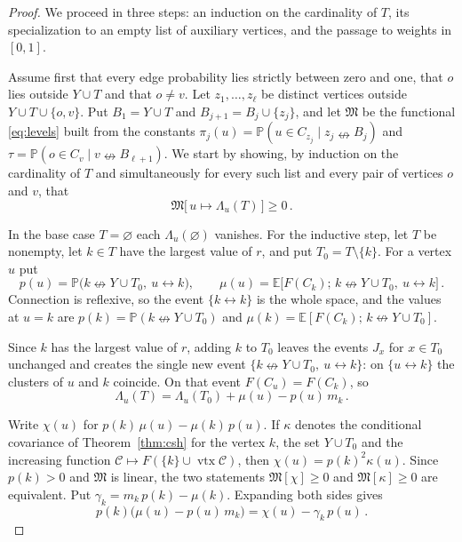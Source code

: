 \documentclass[11pt]{article}
\theoremstyle{definition}
\theoremstyle{remark}
\newcommand{\PP}{\mathbb P}
\newcommand{\EE}{\mathbb E}
\newcommand{\con}{\leftrightarrow}
\newcommand{\ncon}{\nleftrightarrow}
\newcommand{\eC}{\mathcal C}
\DeclareMathOperator{\vtx}{vtx}
\newcommand{\Marg}{\mathfrak M}
\begin{document}
\begin{proof}
We proceed in three steps: an induction on the cardinality of $T$, its specialization to an
empty list of auxiliary vertices, and the passage to weights in $[0,1]$.

Assume first that every edge probability lies strictly between zero and one, that $o$ lies
outside $Y\cup T$ and that $o\neq v$. Let $z_1,\dots,z_\ell$ be distinct vertices outside
$Y\cup T\cup\{o,v\}$. Put $B_1=Y\cup T$ and $B_{j+1}=B_j\cup\{z_j\}$, and let $\Marg$ be the functional
\eqref{eq:levels} built from the constants
$\pi_j(u)=\PP(u\in C_{z_j}\mid z_j\ncon B_j)$ and
$\tau=\PP(o\in C_v\mid v\ncon B_{\ell+1})$. We start by
showing, by induction on the cardinality of $T$ and simultaneously for every such list and
every pair of vertices $o$ and $v$, that
\begin{equation}\label{eq:s5d}
 \Marg\bigl[\,u\mapsto\Lambda_u(T)\,\bigr]\geq 0\,.
\end{equation}

In the base case $T=\varnothing$ each $\Lambda_u(\varnothing)$ vanishes. For the inductive
step, let $T$ be nonempty, let $k\in T$ have the largest value of $r$, and put
$T_0=T\setminus\{k\}$. For a vertex $u$ put
\[
 p(u)=\PP\bigl(k\ncon Y\cup T_0,\ u\con k\bigr),\qquad
 \mu(u)=\EE\bigl[F(C_k);\,k\ncon Y\cup T_0,\ u\con k\bigr]\,.
\]
Connection is reflexive, so the event $\{k\con k\}$ is the whole space, and the values at
$u=k$ are $p(k)=\PP(k\ncon Y\cup T_0)$ and
$\mu(k)=\EE[F(C_k);\,k\ncon Y\cup T_0]$.

Since $k$ has the largest value of $r$, adding $k$ to $T_0$ leaves the events $J_x$ for
$x\in T_0$ unchanged and creates the single new event $\{k\ncon Y\cup T_0,\ u\con k\}$: on
$\{u\con k\}$ the clusters of $u$ and $k$ coincide. On that event $F(C_u)=F(C_k)$, so
\begin{equation}\label{eq:peel}
 \Lambda_u(T)=\Lambda_u(T_0)+\mu(u)-p(u)\,m_k\,.
\end{equation}

Write $\chi(u)$ for $p(k)\,\mu(u)-\mu(k)\,p(u)$. If $\kappa$ denotes the conditional
covariance of Theorem~\ref{thm:csh} for the vertex $k$, the set $Y\cup T_0$ and the
increasing function $\eC\mapsto F(\{k\}\cup\vtx\eC)$, then $\chi(u)=p(k)^2\kappa(u)$.
Since $p(k)>0$ and $\Marg$ is linear, the two statements $\Marg[\chi]\geq0$ and
$\Marg[\kappa]\geq0$ are equivalent. Put $\gamma_k=m_k\,p(k)-\mu(k)$. Expanding
both sides gives
\begin{equation}\label{eq:covid}
 p(k)\bigl(\mu(u)-p(u)\,m_k\bigr)=\chi(u)-\gamma_k\,p(u)\,.
\end{equation}


\end{proof}
\end{document}
